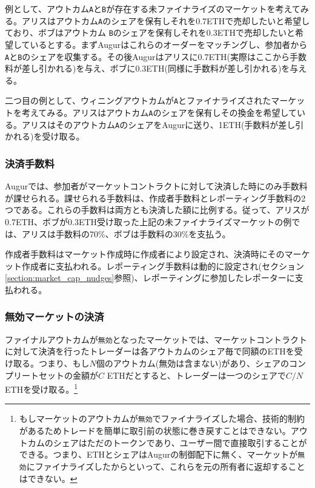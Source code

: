 \documentclass[floatfix,reprint,nofootinbib,amsmath,amssymb,epsfig,pre,floats,letterpaper,groupedaffiliation]{revtex4-1}
\theoremstyle{definition}
\theoremstyle{definition}
\theoremstyle{definition}
\begin{document}
例として、アウトカム\texttt{A}と\texttt{B}が存在する未ファイナライズのマーケットを考えてみる。アリスはアウトカム\texttt{A}のシェアを保有しそれを0.7ETHで売却したいと希望しており、ボブはアウトカム \texttt{B}のシェアを保有しそれを0.3ETHで売却したいと希望しているとする。まずAugurはこれらのオーダーをマッチングし、参加者から\texttt{A}と\texttt{B}のシェアを収集する。その後Augurはアリスに0.7ETH(実際はここから手数料が差し引かれる)を与え、ボブに0.3ETH(同様に手数料が差し引かれる)を与える。

二つ目の例として、ウィニングアウトカムが\texttt{A}とファイナライズされたマーケットを考えてみる。アリスはアウトカム\texttt{A}のシェアを保有しその換金を希望している。アリスはそのアウトカム\texttt{A}のシェアをAugurに送り、1ETH(手数料が差し引かれる)を受け取る。

\subsubsection{決済手数料}

Augurでは、参加者がマーケットコントラクトに対して決済した時にのみ手数料が課せられる。課せられる手数料は、作成者手数料とレポーティング手数料の2つである。これらの手数料は両方とも決済した額に比例する。従って、アリスが0.7ETH、ボブが0.3ETH受け取った上記の未ファイナライズマーケットの例では、アリスは手数料の70\%、ボブは手数料の30\%を支払う。

作成者手数料はマーケット作成時に作成者により設定され、決済時にそのマーケット作成者に支払われる。レポーティング手数料は動的に設定され(セクション\ref{section:market_cap_nudges}参照)、レポーティングに参加したレポーターに支払われる。

\subsubsection{無効マーケットの決済}\label{section:settlement_of_invalid_markets}

ファイナルアウトカムが\texttt{無効}となったマーケットでは、マーケットコントラクトに対して決済を行ったトレーダーは各アウトカムのシェア毎で同額のETHを受け取る。つまり、もし$N$個のアウトカム(無効は含まない)があり、シェアのコンプリートセットの金額が$C$ ETHだとすると、トレーダーは一つのシェアで$C/N$ ETHを受け取る。\footnote{もしマーケットのアウトカムが\texttt{無効}でファイナライズした場合、技術的制約があるためトレードを簡単に取引前の状態に巻き戻すことはできない。アウトカムのシェアはただのトークンであり、ユーザー間で直接取引することができる。つまり、ETHとシェアはAugurの制御配下に無く、マーケットが\texttt{無効}にファイナライズしたからといって、これらを元の所有者に返却することはできない。}
\end{document}
